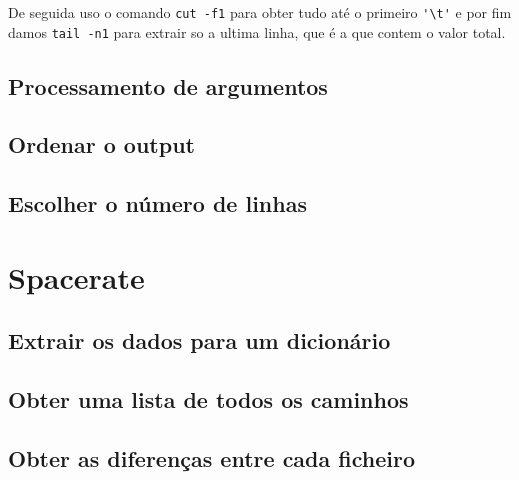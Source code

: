De seguida uso o comando \texttt{cut -f1} para obter tudo até o
primeiro \Verb|'\t'| e por fim damos \texttt{tail -n1} para extrair
so a ultima linha, que é a que contem o valor total.

\subsection{Processamento de argumentos}

\subsection{Ordenar o output}

\subsection{Escolher o número de linhas}

\section{Spacerate}

\subsection{Extrair os dados para um dicionário}

\subsection{Obter uma lista de todos os caminhos}

\subsection{Obter as diferenças entre cada ficheiro}

